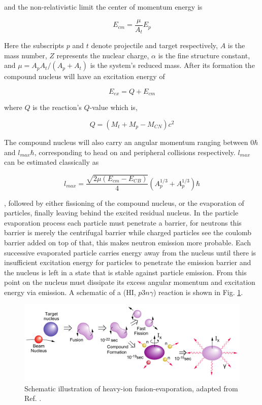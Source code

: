 and the non-relativistic limit the center of momentum energy is

\begin{equation}
\label{eqn:cmf_en}
E_{cm} = \frac{\mu}{A_{t}}E_{p}
\end{equation}

Here the subscripts $p$ and $t$ denote projectile and target respectively, $A$ is the mass number, $Z$ represents the nuclear charge, $\alpha{}$ is the fine structure constant, and $\mu = A_{p}A_{t}/(A_{p}+A_{t})$ is the system's reduced mass. After its formation the compound nucleus will have an excitation energy of

\begin{equation}
\label{eqn:cn_ex}
E_{ex} = Q + E_{cm}
\end{equation}

where $Q$ is the reaction's $Q$-value which is,

\begin{equation}
\label{eqn:cn_form_qvalue}
Q = (M_t+M_p-M_{CN})c^2
\end{equation}

The compound nucleus will also carry an angular momentum ranging between $0 \hbar$ and $l_{max} \hbar$, corresponding to head on and peripheral collisions respectively. $l_{max}$ can be estimated classically as

\begin{equation}
\label{eqn:cn_lmax}
l_{max} = \frac{\sqrt{2\mu(E_{cm}-E_{CB})}}{4}(A^{1/3}_p + A^{1/3}_p)\hbar
\end{equation}

, followed by either fissioning of the compound nucleus, or the evaporation of particles, finally leaving behind the excited residual nucleus. In the particle evaporation process each particle must penetrate a barrier, for neutrons this barrier is merely the centrifugal barrier while charged particles see the coulomb barrier added on top of that, this makes neutron emission more probable. Each successive evaporated particle carries energy away from the nucleus until there is insufficient excitation energy for particles to penetrate the emission barrier and the nucleus is left in a state that is stable against particle emission. From this point on the nucleus must dissipate its excess angular momentum and excitation energy via \gr{} emission. A schematic of a (HI, $p3n\gamma{}$) reaction is shown in Fig. \ref{fig:chp3-fus-evap-schem}.
\begin{figure}
	\centerline{\includegraphics[width=\textwidth]{./img/c3/fusion_evaporation_horizontal.pdf}}
	\caption{Schematic illustration of heavy-ion fusion-evaporation, adapted from Ref. \cite{gsBooklet}.}
	\label{fig:chp3-fus-evap-schem}
\end{figure}

